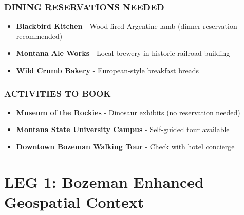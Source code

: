 \documentclass[
  11pt,
]{article}
\providecommand{\tightlist}{%
  \setlength{\itemsep}{0pt}\setlength{\parskip}{0pt}}
\begin{document}
\subsubsection{\texorpdfstring{\textcolor{primary}{DINING RESERVATIONS NEEDED}}{}}\label{section-7}

\begin{itemize}
\tightlist
\item
  \textbf{\textcolor{secondary}{Blackbird Kitchen}} - Wood-fired
  Argentine lamb (dinner reservation recommended)
\item
  \textbf{\textcolor{secondary}{Montana Ale Works}} - Local brewery in
  historic railroad building
\item
  \textbf{\textcolor{secondary}{Wild Crumb Bakery}} - European-style
  breakfast breads
\end{itemize}

\subsubsection{\texorpdfstring{\textcolor{primary}{ACTIVITIES TO BOOK}}{}}\label{section-8}

\begin{itemize}
\tightlist
\item
  \textbf{\textcolor{secondary}{Museum of the Rockies}} - Dinosaur
  exhibits (no reservation needed)
\item
  \textbf{\textcolor{secondary}{Montana State University Campus}} -
  Self-guided tour available
\item
  \textbf{\textcolor{secondary}{Downtown Bozeman Walking Tour}} - Check
  with hotel concierge
\end{itemize}

\newpage

\section{\texorpdfstring{\textcolor{primary}{LEG 1: Bozeman Enhanced Geospatial Context}}{}}\label{section-9}
\end{document}
